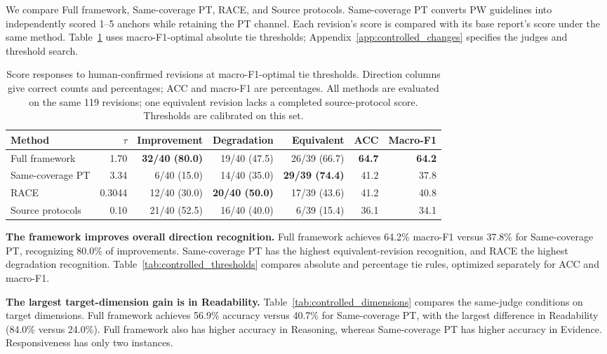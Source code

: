 \documentclass{article}
\begin{document}
We compare Full framework, Same-coverage PT, RACE, and Source protocols. Same-coverage PT converts PW guidelines into independently scored 1--5 anchors while retaining the PT channel. Each revision's score is compared with its base report's score under the same method. Table~\ref{tab:controlled_response} uses macro-F1-optimal absolute tie thresholds; Appendix~\ref{app:controlled_changes} specifies the judges and threshold search.

\begin{table}[t]
\centering\small\setlength{\tabcolsep}{3.5pt}
\begin{tabular}{@{}lrrrrrr@{}}
\toprule
Method & $\tau$ & Improvement & Degradation & Equivalent & ACC & Macro-F1 \\
\midrule
Full framework & 1.70 & \textbf{32/40 (80.0)} & 19/40 (47.5) & 26/39 (66.7) & \textbf{64.7} & \textbf{64.2} \\
Same-coverage PT & 3.34 & 6/40 (15.0) & 14/40 (35.0) & \textbf{29/39 (74.4)} & 41.2 & 37.8 \\
RACE & 0.3044 & 12/40 (30.0) & \textbf{20/40 (50.0)} & 17/39 (43.6) & 41.2 & 40.8 \\
Source protocols & 0.10 & 21/40 (52.5) & 16/40 (40.0) & 6/39 (15.4) & 36.1 & 34.1 \\
\bottomrule
\end{tabular}
\caption{Score responses to human-confirmed revisions at macro-F1-optimal tie thresholds. Direction columns give correct counts and percentages; ACC and macro-F1 are percentages. All methods are evaluated on the same 119 revisions; one equivalent revision lacks a completed source-protocol score. Thresholds are calibrated on this set.}
\label{tab:controlled_response}
\end{table}

\textbf{The framework improves overall direction recognition.}
Full framework achieves 64.2\% macro-F1 versus 37.8\% for Same-coverage PT, recognizing 80.0\% of improvements. Same-coverage PT has the highest equivalent-revision recognition, and RACE the highest degradation recognition. Table~\ref{tab:controlled_thresholds} compares absolute and percentage tie rules, optimized separately for ACC and macro-F1.

\textbf{The largest target-dimension gain is in Readability.}
Table~\ref{tab:controlled_dimensions} compares the same-judge conditions on target dimensions. Full framework achieves 56.9\% accuracy versus 40.7\% for Same-coverage PT, with the largest difference in Readability (84.0\% versus 24.0\%). Full framework also has higher accuracy in Reasoning, whereas Same-coverage PT has higher accuracy in Evidence. Responsiveness has only two instances.
\end{document}
